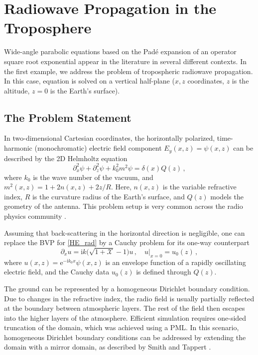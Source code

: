\documentclass[11pt,a4paper]{article}
\newcommand{\iu}{\mathrm{i}} %
\newcommand{\cX}{\mathcal{X}}
\theoremstyle{plain}%
\theoremstyle{definition}
\theoremstyle{remark}
\begin{document}


\section{Radiowave Propagation in the Troposphere}\label{sec:radio}
Wide-angle parabolic \linebreak equations based on the Pad\'e expansion of an operator square root exponential appear in the literature in several different contexts. 
In the first example, we address the problem of tropospheric radiowave propagation. 
In this case, equation is solved on a vertical half-plane ($x,z$ coordinates, $z$ is the altitude, $z=0$ is the Earth's surface). 

\subsection{The Problem Statement}
In two-dimensional Cartesian coordinates, the horizontally polarized, time-harmonic (monochromatic) electric field component \linebreak $E_y(x, z) =  \psi(x, z)$ can be described by the 2D %
 Helmholtz equation
\begin{equation}\label{HE_rad}
    \partial_x^2 \psi + \partial_z^2 \psi + k_0^2m^2\psi = \delta(x)Q(z)\,,
\end{equation}
where $k_0$ is the wave number of the vacuum, and $m^2(x, z) = 1 + 2n(x, z) + 2z/R$. 
Here, $n(x, z)$ is the variable refractive index, $R$ is the curvature radius of the Earth's surface, and $Q(z)$ models the geometry of the antenna. 
This problem setup is very common across the radio physics community \cite{levy2000parabolic, lytaev2018splitirregular, lytaev2018nonlocal, lytaev2026}.

Assuming that back-scattering in the horizontal direction is negligible, one can replace the BVP for \eqref{HE_rad} by a Cauchy problem for its one-way counterpart
\begin{equation*}
    \partial_x u = \iu k \bigl( \sqrt{1 + \cX} - 1 \bigr)u\,, \quad u|_{x=0} = u_0(z)\,,
\end{equation*}
where $u(x,z) = \mathrm{e}^{-\iu k_0 x}\psi(x,z)$ is an envelope function of a rapidly oscillating electric field, and the Cauchy data $u_0(z)$ is defined through $Q(z)$.

The ground can be represented by a homogeneous Dirichlet boundary condition. 
Due to changes in the refractive index,
the radio field is usually partially reflected at the boundary between atmospheric layers. 
The rest of the field then escapes into the higher layers of the atmosphere. 
Efficient simulation requires one-sided truncation of the domain, which was achieved using a PML. 
% 
In this scenario, homogeneous Dirichlet boundary conditions can be addressed by extending the domain with a mirror domain,
as described by Smith and Tappert \cite{smith1993umpe}.
\end{document}
